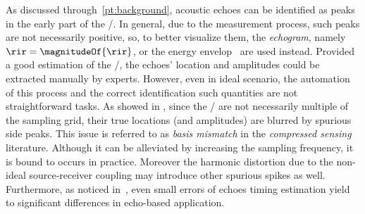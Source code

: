 As discussed through~\cref{pt:background}, acoustic echoes can be identified as peaks in the early part of the \RIR/.
In general, due to the measurement process, such peaks are not necessarily positive, so, to better visualize them, the \textit{echogram}, namely $\rir = \magnitudeOf{\rir}$, or the energy envelop~ are used instead.
Provided a good estimation of the \RIR/, the echoes' location and amplitudes could be extracted manually by experts.
However, even in ideal scenario, the automation of this process and the correct identification such quantities are not straightforward tasks.
As showed in , since the \TOAs/ are not necessarily multiple of the sampling grid, their true locations (and amplitudes) are blurred by spurious side peaks.
This issue is referred to as \textit{basis mismatch} in the \textit{compressed sensing} literature.
Although it can be alleviated by increasing the sampling frequency, it is bound to occurs in practice.
Moreover the harmonic distortion due to the non-ideal source-receiver coupling may introduce other spurious spikes as well.
Furthermore, as noticed in~, even small errors of echoes timing estimation yield to significant differences in echo-based application.

